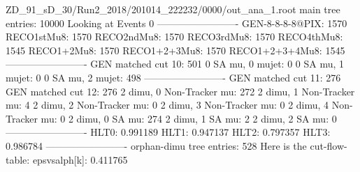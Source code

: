 ZD_91_sD_30/Run2_2018/201014_222232/0000/out_ana_1.root
main tree entries: 10000
Looking at Events 0
-------------------------
GEN-8-8-8-8@PIX: 1570
RECO1stMu8: 1570
RECO2ndMu8: 1570
RECO3rdMu8: 1570
RECO4thMu8: 1545
RECO1+2Mu8: 1570
RECO1+2+3Mu8: 1570
RECO1+2+3+4Mu8: 1545
-------------------------
GEN matched cut 10: 501
0 SA mu, 0 mujet: 0
0 SA mu, 1 mujet: 0
0 SA mu, 2 mujet: 498
-------------------------
GEN matched cut 11: 276
GEN matched cut 12: 276
2 dimu, 0 Non-Tracker mu: 272
2 dimu, 1 Non-Tracker mu: 4
2 dimu, 2 Non-Tracker mu: 0
2 dimu, 3 Non-Tracker mu: 0
2 dimu, 4 Non-Tracker mu: 0
2 dimu, 0 SA mu: 274
2 dimu, 1 SA mu: 2
2 dimu, 2 SA mu: 0
-------------------------
HLT0: 0.991189
HLT1: 0.947137
HLT2: 0.797357
HLT3: 0.986784
-------------------------
orphan-dimu tree entries: 528
Here is the cut-flow-table:
epsvsalph[k]: 0.411765
        
